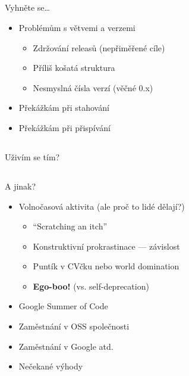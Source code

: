\documentclass{beamer}
\begin{document}
\subsection{}
\begin{frame}{Vyhněte se\dots}
\begin{itemize}
\item Problémům s větvemi a verzemi
\begin{itemize}
\item Zdržování releasů (nepřiměřené cíle)
\item Příliš košatá struktura
\item Nesmyslná čísla verzí (věčné 0.x)
\end{itemize}
\item Překážkám při stahování
\item Překážkám při přispívání
\end{itemize}
\end{frame}

\subsection{}
\begin{frame}{Uživím se tím?}
\end{frame}

\subsection{}
\begin{frame}{A jinak?}
\begin{itemize}
\item Volnočasová aktivita (ale proč to lidé dělají?)
\pause
\begin{itemize}
\item ``Scratching an itch''
\item Konstruktivní prokrastinace --- závislost
\item Puntík v CVčku nebo world domination
\item {\bf Ego-boo!} (vs. self-deprecation)
\end{itemize}
\pause
\item Google Summer of Code
\item Zaměstnání v OSS společnosti
\item Zaměstnání v Google atd.
\item Nečekané výhody
\end{itemize}
\end{frame}
\end{document}
